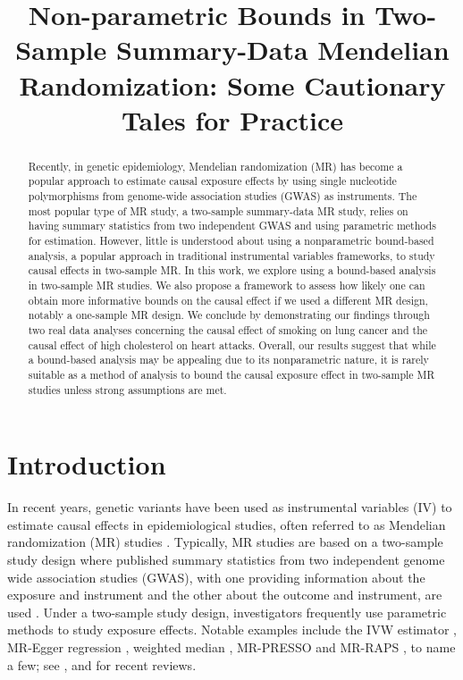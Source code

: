 \documentclass[
]{article}
\title{Non-parametric Bounds in Two-Sample Summary-Data Mendelian Randomization: Some Cautionary Tales for Practice}
\author{}
\date{\vspace{-2.5em}}
\theoremstyle{plain}
\begin{document}
\maketitle
\begin{abstract}
Recently, in genetic epidemiology, Mendelian randomization (MR) has become a popular approach to estimate causal exposure effects by using single nucleotide polymorphisms from genome-wide association studies (GWAS) as instruments. The most popular type of MR study, a two-sample summary-data MR study, relies on having summary statistics from two independent GWAS and using parametric methods for estimation. However, little is understood about using a nonparametric bound-based analysis, a popular approach in traditional instrumental variables frameworks, to study causal effects in two-sample MR. In this work, we explore using a bound-based analysis in two-sample MR studies. We also propose a framework to assess how likely one can obtain more informative bounds on the causal effect if we used a different MR design, notably a one-sample MR design. We conclude by demonstrating our findings through two real data analyses concerning the causal effect of smoking on lung cancer and the causal effect of high cholesterol on heart attacks. Overall, our results suggest that while a bound-based analysis may be appealing due to its nonparametric nature, it is rarely suitable as a method of analysis to bound the causal exposure effect in two-sample MR studies unless strong assumptions are met.
\end{abstract}

\newpage

\hypertarget{introduction}{%
\section{Introduction}\label{introduction}}

In recent years, genetic variants have been used as instrumental variables (IV) to estimate causal effects in epidemiological studies, often referred to as Mendelian randomization (MR) studies \autocite{davey_smith_mendelian_2003,lawlor_mendelian_2008,burgess_mendelian_2015}. Typically, MR studies are based on a two-sample study design where published summary statistics from two independent genome wide association studies (GWAS), with one providing information about the exposure and instrument and the other about the outcome and instrument, are used \autocite{burgess_mendelian_2013,burgess_using_2015,davies_reading_2018}. Under a two-sample study design, investigators frequently use parametric methods to study exposure effects. Notable examples include the IVW estimator \autocite{burgess_mendelian_2013}, MR-Egger regression \autocite{bowden_assessing_2016}, weighted median \autocite{bowden_consistent_2016}, MR-PRESSO \autocite{verbanck_detection_2018} and MR-RAPS \autocite{zhao_statistical_2020}, to name a few; see \textcite{burgess_mendelian_2015}, \textcite{burgess_review_2017} and \textcite{slob_comparison_2020} for recent reviews.
\end{document}
